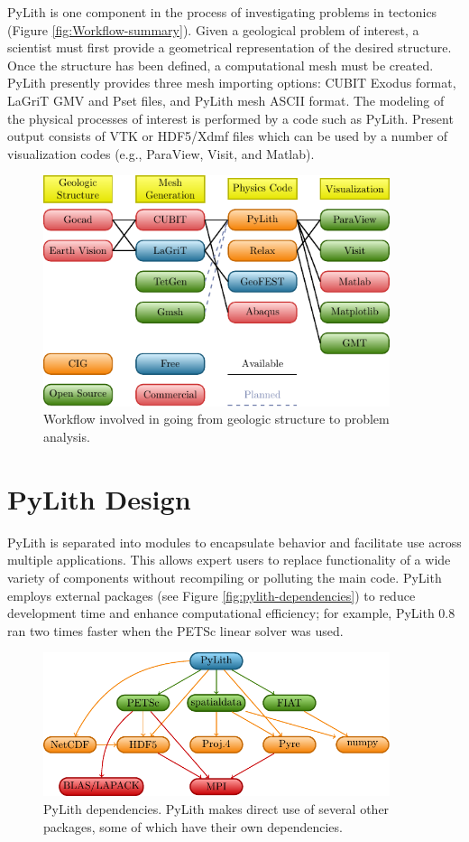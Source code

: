 PyLith is one component in the process of investigating problems in
tectonics (Figure \vref{fig:Workflow-summary}). Given a geological
problem of interest, a scientist must first provide a geometrical
representation of the desired structure. Once the structure has been
defined, a computational mesh must be created. PyLith presently
provides three mesh importing options: CUBIT Exodus format, LaGriT GMV
and Pset files, and PyLith mesh ASCII format. The modeling of the
physical processes of interest is performed by a code such as
PyLith. Present output consists of VTK or HDF5/Xdmf files which can be
used by a number of visualization codes (e.g., ParaView, Visit, and
Matlab).

\begin{figure}[htbp]
  \includegraphics[width=4in]{intro/figs/workflow}
  \caption{Workflow involved in going from geologic structure to
    problem analysis.}
  \label{fig:Workflow-summary}
\end{figure}

\section{PyLith Design}

PyLith is separated into modules to encapsulate behavior and facilitate
use across multiple applications. This allows expert users to replace
functionality of a wide variety of components without recompiling
or polluting the main code. PyLith employs external packages (see
Figure \vref{fig:pylith-dependencies}) to reduce development time
and enhance computational efficiency; for example, PyLith 0.8 ran
two times faster when the PETSc linear solver was used.

\begin{figure}[htbp]
  \includegraphics[width=4in]{intro/figs/packages}
  \caption{PyLith dependencies. PyLith makes direct use of several
    other packages, some of which have their own dependencies.}
  \label{fig:pylith-dependencies}
\end{figure}

